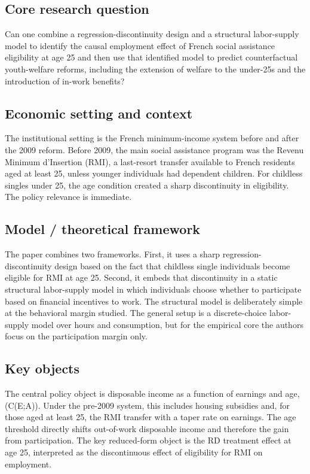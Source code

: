 \documentclass[11pt,a4paper]{article}
\begin{document}
\subsection*{Core research question}
Can one combine a regression-discontinuity design and a structural labor-supply model to identify the causal employment effect of French social assistance eligibility at age 25 and then use that identified model to predict counterfactual youth-welfare reforms, including the extension of welfare to the under-25s and the introduction of in-work benefits?

\subsection*{Economic setting and context}
The institutional setting is the French minimum-income system before and after the 2009 reform. Before 2009, the main social assistance program was the Revenu Minimum d’Insertion (RMI), a last-resort transfer available to French residents aged at least 25, unless younger individuals had dependent children. For childless singles under 25, the age condition created a sharp discontinuity in eligibility. The policy relevance is immediate.

\subsection*{Model / theoretical framework}
The paper combines two frameworks. First, it uses a sharp regression-discontinuity design based on the fact that childless single individuals become eligible for RMI at age 25. Second, it embeds that discontinuity in a static structural labor-supply model in which individuals choose whether to participate based on financial incentives to work. The structural model is deliberately simple at the behavioral margin studied. The general setup is a discrete-choice labor-supply model over hours and consumption, but for the empirical core the authors focus on the participation margin only.

\subsection*{Key objects}
The central policy object is disposable income as a function of earnings and age, (C(E;A)). Under the pre-2009 system, this includes housing subsidies and, for those aged at least 25, the RMI transfer with a taper rate on earnings. The age threshold directly shifts out-of-work disposable income and therefore the gain from participation. The key reduced-form object is the RD treatment effect at age 25, interpreted as the discontinuous effect of eligibility for RMI on employment.
\end{document}
